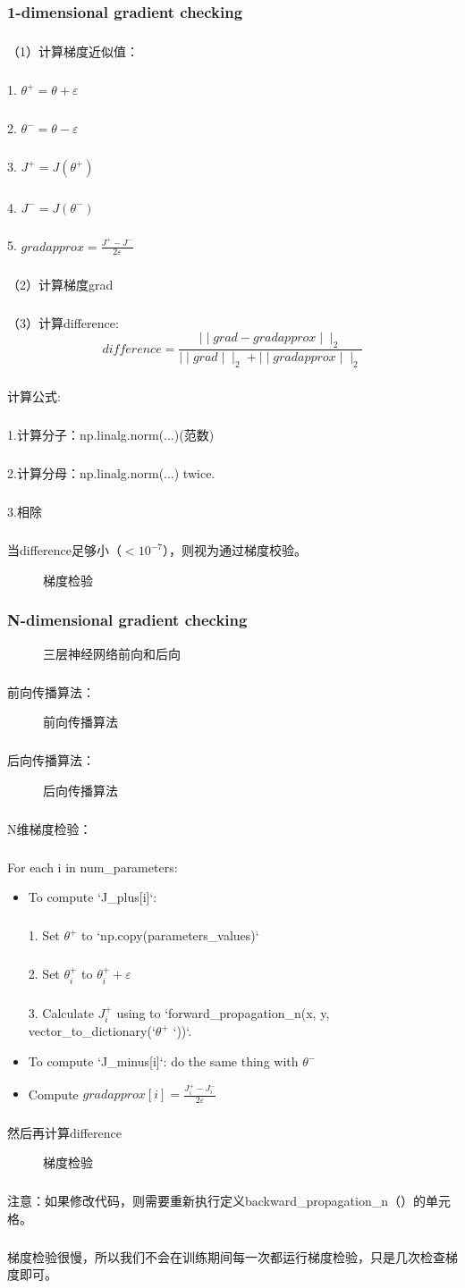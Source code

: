 \documentclass{article}
\begin{document}
\begin{CJK}{UTF8}{gbsn}
\subsubsection{1-dimensional gradient checking}
\subparagraph{}
（1）计算梯度近似值：
\subparagraph{}
    1. $\theta^{+} = \theta + \varepsilon$
\subparagraph{}
    2. $\theta^{-} = \theta - \varepsilon$
\subparagraph{}
    3. $J^{+} = J(\theta^{+})$
\subparagraph{}
    4. $J^{-} = J(\theta^{-})$
\subparagraph{}
    5. $gradapprox = \frac{J^{+} - J^{-}}{2  \varepsilon}$
\subparagraph{}
（2）计算梯度grad
\subparagraph{}
（3）计算difference:
\begin{equation}
difference = \frac {\mid\mid grad - gradapprox \mid\mid_2}{\mid\mid grad \mid\mid_2 + \mid\mid gradapprox \mid\mid_2} \tag{2}
\end{equation}
\subparagraph{}
计算公式:
\subparagraph{}
1.计算分子：np.linalg.norm(...)(范数)
\subparagraph{}
2.计算分母：np.linalg.norm(...) twice.
\subparagraph{}
3.相除
\subparagraph{}
当difference足够小（$<10^{-7}$），则视为通过梯度校验。
\begin{figure}[H]
\label{fig:30}
\caption{梯度检验}
\end{figure}
\subsubsection{N-dimensional gradient checking}
\begin{figure}[H]
\label{fig:31}
\caption{三层神经网络前向和后向}
\end{figure}
\subparagraph{}
前向传播算法：
\begin{figure}[H]
\label{fig:32}
\caption{前向传播算法}
\end{figure}
\subparagraph{}
后向传播算法：
\begin{figure}[H]
\label{fig:33}
\caption{后向传播算法}
\end{figure}
\subparagraph{}
N维梯度检验：
\subparagraph{}
For each i in num\_{}parameters:
\begin{itemize}
\item To compute `J\_{}plus[i]`:
\subparagraph{}
1. Set $\theta^{+}$ to `np.copy(parameters\_{}values)`
\subparagraph{}
 2. Set $\theta^{+}_i$ to $\theta^{+}_i + \varepsilon$
\subparagraph{}
3. Calculate $J^{+}_i$ using to `forward\_{}propagation\_{}n(x, y, vector\_{}to\_{}dictionary(`$\theta^{+}$ `))`. 
\item To compute `J\_{}minus[i]`: do the same thing with $\theta^{-}$
\item Compute $gradapprox[i] = \frac{J^{+}_i - J^{-}_i}{2 \varepsilon}$
\end{itemize}
\subparagraph{}
然后再计算difference
\begin{figure}[H]
\label{fig:35}
\caption{梯度检验}
\end{figure}
\subparagraph{}
注意：如果修改代码，则需要重新执行定义backward\_{}propagation\_{}n（）的单元格。
\subparagraph{}
梯度检验很慢，所以我们不会在训练期间每一次都运行梯度检验，只是几次检查梯度即可。

\end{CJK}
\end{document}
